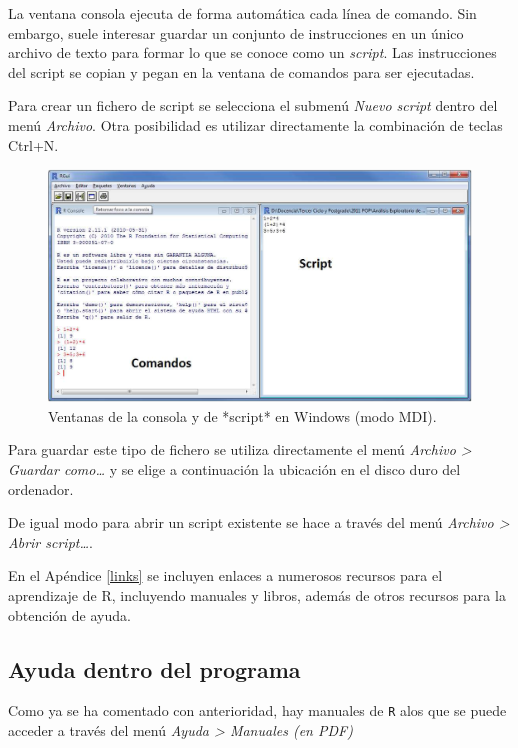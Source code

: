 \documentclass[]{book}
\begin{document}
La ventana consola ejecuta de
forma automática cada línea de comando. Sin embargo, suele interesar
guardar un conjunto de instrucciones en un único archivo de texto para
formar lo que se conoce como un \emph{script}. Las instrucciones del script
se copian y pegan en la ventana de comandos para ser ejecutadas.

Para crear un fichero de script se selecciona el submenú \emph{Nuevo script}
dentro del menú \emph{Archivo}. Otra posibilidad es utilizar directamente la
combinación de teclas Ctrl+N.

\begin{figure}[!htb]

{\centering \includegraphics[width=0.7\linewidth]{figuras/script} 

}

\caption{Ventanas de la consola y de *script* en Windows (modo MDI).}\label{fig:script}
\end{figure}

Para guardar este tipo de fichero se utiliza directamente el menú \emph{Archivo \textgreater{} Guardar como\ldots{}}
y se elige a continuación la ubicación en el disco duro del ordenador.

De igual modo para abrir un script existente se hace a través del menú \emph{Archivo \textgreater{} Abrir script\ldots{}}.

En el Apéndice \ref{links} se incluyen enlaces a numerosos recursos para el aprendizaje de R,
incluyendo manuales y libros, además de otros recursos para la obtención de ayuda.

\hypertarget{ayuda-dentro-del-programa}{%
\subsection{Ayuda dentro del programa}\label{ayuda-dentro-del-programa}}

Como ya se ha comentado con anterioridad,
hay manuales de \texttt{R} alos que se puede acceder a través del menú
\emph{Ayuda \textgreater{} Manuales (en PDF)}
\end{document}
